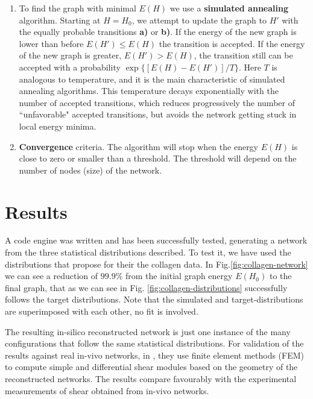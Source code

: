 \begin{enumerate}[label=\textbf{\Roman*}]
  \item To find the graph with minimal $E(H)$ we use a \textbf{simulated
  annealing} algorithm. Starting at $H=H_0$, we attempt to update the graph to
  $H'$ with the equally probable transitions \textbf{a)} or \textbf{b)}.  If the
  energy of the new graph is lower than before $E(H')\leq E(H)$ the transition
  is accepted. If the energy of the new graph is greater, $E(H')> E(H)$, the
  transition still can be accepted with a probability $\exp\{[E(H)-E(H')]/T\}$.
  Here $T$ is  analogous to temperature, and it is the main characteristic of
  simulated annealing algorithms. This temperature decays exponentially with the number of accepted transitions, which reduces
  progressively the number of ``unfavorable" accepted transitions, but avoids
  the network getting stuck in local energy minima.
  \item \textbf{Convergence} criteria. The algorithm will stop when the energy
  $E(H)$ is close to zero or smaller than a threshold.
  The threshold will depend on the number of nodes (size) of the network.
\end{enumerate}

\section{Results}
A code engine was written and has been successfully tested,
generating a network from the three statistical distributions described.
To test it, we have used the distributions that
\citet{lindstrom_biopolymer_2010} propose for their
the collagen data. In Fig.\ref{fig:collagen-network} we
can see a reduction of $99.9\%$ from the initial graph energy $E(H_0)$ to the
final graph, that as we can see in Fig.
\ref{fig:collagen-distributions} successfully follows the target distributions.
Note that the simulated and target-distributions are superimposed with each other, no fit is involved.

The resulting in-silico reconstructed network is just one instance of the many configurations that follow the same statistical distributions. For validation of the results against real in-vivo networks, in \citet{lindstrom_finite-strain_2013}, they use finite element methods (FEM) to compute simple and differential shear modules based on the geometry of the reconstructed networks. The results compare favourably with the experimental measurements of shear obtained from in-vivo networks.

